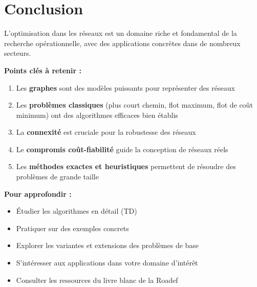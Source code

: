 \documentclass[12pt,a4paper]{article}
\begin{document}
\newpage
\section{Conclusion}

\begin{important}
L'optimisation dans les réseaux est un domaine riche et fondamental de la recherche opérationnelle, avec des applications concrètes dans de nombreux secteurs.

\textbf{Points clés à retenir :}
\begin{enumerate}
    \item Les \textcolor{titrebleu}{\textbf{graphes}} sont des modèles puissants pour représenter des réseaux
    
    \item Les \textcolor{defvert}{\textbf{problèmes classiques}} (plus court chemin, flot maximum, flot de coût minimum) ont des algorithmes efficaces bien établis
    
    \item La \textcolor{algoviolet}{\textbf{connexité}} est cruciale pour la robustesse des réseaux
    
    \item Le \textcolor{exempleorange}{\textbf{compromis coût-fiabilité}} guide la conception de réseaux réels
    
    \item Les \textcolor{importantrouge}{\textbf{méthodes exactes et heuristiques}} permettent de résoudre des problèmes de grande taille
\end{enumerate}
\end{important}

\begin{astuce}
\textbf{Pour approfondir :}

\begin{itemize}
    \item Étudier les algorithmes en détail (TD)
    \item Pratiquer sur des exemples concrets
    \item Explorer les variantes et extensions des problèmes de base
    \item S'intéresser aux applications dans votre domaine d'intérêt
    \item Consulter les ressources du livre blanc de la Roadef
\end{itemize}
\end{astuce}
\end{document}
